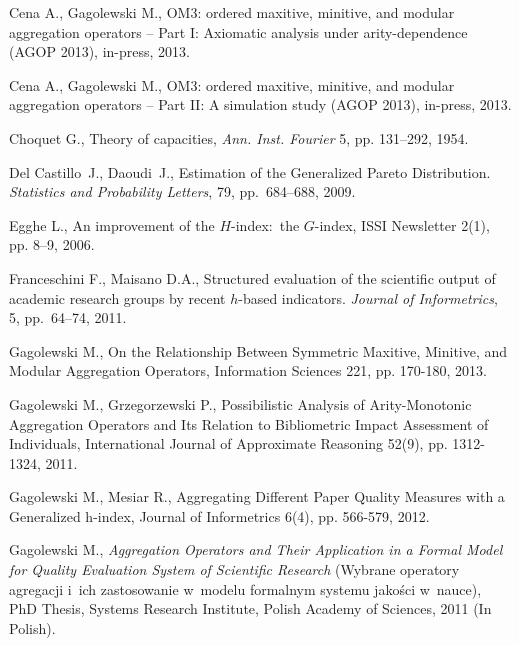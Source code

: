 \documentclass[11pt]{article}\usepackage{graphicx, color}
\theoremstyle{remark}
\theoremstyle{definition}
\begin{document}
\begin{thebibliography}{100}



Cena A., Gagolewski M., 
OM3: ordered maxitive, minitive, and modular aggregation operators -- 
Part I: Axiomatic analysis under arity-dependence (AGOP 2013), in-press, 2013.

Cena A., Gagolewski M., 
OM3: ordered maxitive, minitive, and modular aggregation operators --
Part II: A simulation study (AGOP 2013), in-press, 2013.

Choquet G., Theory of capacities,
\textit{Ann. Inst. Fourier} 5, pp. 131--292, 1954.

{Del Castillo}~J., Daoudi~J.,
\newblock Estimation of the {G}eneralized {P}areto {D}istribution.
\newblock \textit{Statistics and Probability Letters}, 79, pp.~684--688, 2009.


Egghe L., An improvement of the $H$-index:~the $G$-index, 
ISSI Newsletter 2(1), pp. 8--9, 2006.

Franceschini F., Maisano D.A.,
\newblock Structured evaluation of the scientific output of academic research
  groups by recent $h$-based indicators.
\newblock \textit{Journal of Informetrics}, 5, pp.~64--74, 2011.

Gagolewski M., 
On the Relationship Between Symmetric Maxitive, Minitive, and Modular Aggregation Operators, 
Information Sciences 221, pp. 170-180, 2013.

Gagolewski M., Grzegorzewski P., 
Possibilistic Analysis of Arity-Monotonic Aggregation Operators and Its Relation to Bibliometric Impact Assessment of Individuals, 
International Journal of Approximate Reasoning 52(9), pp. 1312-1324, 2011.

Gagolewski M., Mesiar R., 
Aggregating Different Paper Quality Measures with a Generalized h-index, 
Journal of Informetrics 6(4), pp. 566-579, 2012.

Gagolewski M., \textit{Aggregation Operators and Their Application in a Formal Model for Quality Evaluation System of Scientific Research}
(Wybrane operatory agregacji i~ich zastosowanie w~modelu formalnym systemu jakości w~nauce),
PhD Thesis, Systems Research Institute, Polish Academy of Sciences, 2011 (In Polish).



\end{thebibliography}
\end{document}
